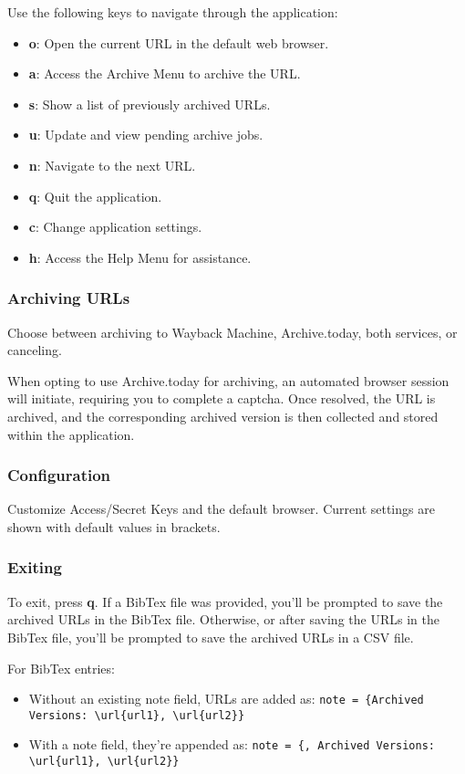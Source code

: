 Use the following keys to navigate through the application:

\begin{itemize}
	\item \textbf{o}: Open the current URL in the default web browser.
	\item \textbf{a}: Access the Archive Menu to archive the URL.
	\item \textbf{s}: Show a list of previously archived URLs.
	\item \textbf{u}: Update and view pending archive jobs.
	\item \textbf{n}: Navigate to the next URL.
	\item \textbf{q}: Quit the application.
	\item \textbf{c}: Change application settings.
	\item \textbf{h}: Access the Help Menu for assistance.
\end{itemize}

\subsubsection{Archiving URLs}

Choose between archiving to Wayback Machine, Archive.today, both services, or canceling.

When opting to use Archive.today for archiving, an automated browser session will initiate, requiring you to complete a captcha. Once resolved, the URL is archived, and the corresponding archived version is then collected and stored within the application.

\subsubsection{Configuration}

Customize Access/Secret Keys and the default browser. Current settings are shown with default values in brackets.

\subsubsection{Exiting}

To exit, press \textbf{q}. If a BibTex file was provided, you'll be prompted to save the archived URLs in the BibTex file. Otherwise, or after saving the URLs in the BibTex file, you'll be prompted to save the archived URLs in a CSV file.

For BibTex entries:
\begin{itemize}
	\item Without an existing note field, URLs are added as: \texttt{note = \{Archived Versions: \textbackslash url\{url1\}, \textbackslash url\{url2\}\}}
	\item With a note field, they're appended as: \texttt{note = \{<current note>, Archived Versions: \textbackslash url\{url1\}, \textbackslash url\{url2\}\}}
\end{itemize}
